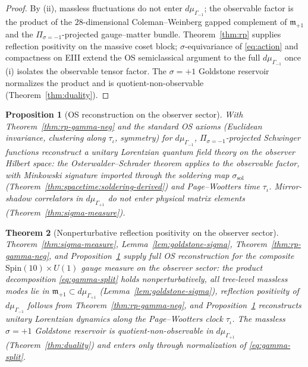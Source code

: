 \documentclass[aps,prd,onecolumn,amsmath,amssymb,nofootinbib,11pt]{revtex4-2}
\numberwithin{equation}{section}
\theoremstyle{plain}
\newtheorem{theorem}{Theorem}[section]
\newtheorem{proposition}[theorem]{Proposition}
\theoremstyle{definition}
\theoremstyle{remark}
\newcommand{\Spin}{\mathrm{Spin}}
\begin{document}
\begin{proof}
By (ii), massless fluctuations do not enter $d\mu_{\Gamma_{-1}}$; the
observable factor is the product of the $28$-dimensional Coleman--Weinberg
gapped complement of $\mathfrak{m}_{+1}$ and the $\Pi_{\sigma=-1}$-projected
gauge--matter bundle. Theorem~\ref{thm:rp} supplies reflection positivity on
the massive coset block; $\sigma$-equivariance of \eqref{eq:action} and
compactness on EIII extend the OS semiclassical argument to the full
$d\mu_{\Gamma_{-1}}$ once (i) isolates the observable tensor factor. The
$\sigma=+1$ Goldstone reservoir normalizes the product and is
quotient-non-observable (Theorem~\ref{thm:duality}).
\end{proof}

\begin{proposition}[OS reconstruction on the observer sector]
\label{prop:os-observer}
With Theorem~\ref{thm:rp-gamma-neg} and the standard
OS axioms (Euclidean invariance, clustering along $\tau_\iota$, symmetry)
for $d\mu_{\Gamma_{-1}}$, $\Pi_{\sigma=-1}$-projected Schwinger
functions reconstruct a unitary Lorentzian quantum field theory on the
observer Hilbert space: the Osterwalder--Schrader theorem
\cite{OsterwalderSchrader1973} applies to the observable factor, with
Minkowski signature imported through the soldering map
$\sigma_{\mathrm{sol}}$ (Theorem~\ref{thm:spacetime:soldering-derived}) and
Page--Wootters time $\tau_\iota$. Mirror-shadow correlators in
$d\mu_{\Gamma_{+1}}$ do not enter physical matrix elements
(Theorem~\ref{thm:sigma-measure}).
\end{proposition}

\begin{theorem}[Nonperturbative reflection positivity on the observer sector]
\label{thm:rp-complete}
Theorem~\ref{thm:sigma-measure}, Lemma~\ref{lem:goldstone-sigma},
Theorem~\ref{thm:rp-gamma-neg}, and Proposition~\ref{prop:os-observer}
supply full OS reconstruction for the composite
$\Spin(10)\times U(1)$ gauge measure on the observer sector: the product
decomposition \eqref{eq:gamma-split} holds nonperturbatively, all tree-level
massless modes lie in $\mathfrak{m}_{+1}\subset d\mu_{\Gamma_{+1}}$
(Lemma~\ref{lem:goldstone-sigma}), reflection positivity of
$d\mu_{\Gamma_{-1}}$ follows from Theorem~\ref{thm:rp-gamma-neg}, and
Proposition~\ref{prop:os-observer} reconstructs unitary Lorentzian dynamics
along the Page--Wootters clock $\tau_\iota$. The massless
$\sigma=+1$ Goldstone reservoir is quotient-non-observable in
$d\mu_{\Gamma_{+1}}$ (Theorem~\ref{thm:duality}) and enters only through
normalization of \eqref{eq:gamma-split}.
\end{theorem}
\end{document}
